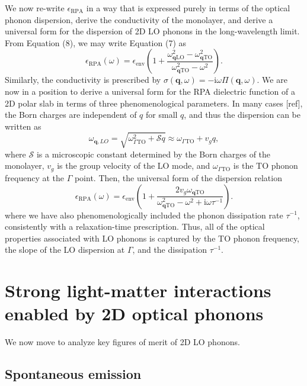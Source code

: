 \documentclass[aps,prb,twocolumn,
	groupedaddress,superscriptaddress,
	amsfonts,amssymb,amsmath,floatfix,
	citeautoscript]{revtex4-1}
\newcommand{\iu}{\mathrm{i}}
\begin{document}
We now re-write $\epsilon_{\mathrm{RPA}}$ in a way that is expressed purely in terms of the optical phonon dispersion, derive the conductivity of the monolayer, and derive a universal form for the dispersion of 2D LO phonons in the long-wavelength limit. From Equation (8), we may write Equation (7) as
\begin{equation}
\epsilon_{\mathrm{RPA}}(\omega) = \epsilon_{\mathrm{env}}\left( 1 + \frac{\omega^2_{\mathbf{q}\mathrm{LO}}-\omega^2_{\mathbf{q}\mathrm{TO}}}{\omega^2_{\mathbf{q}\mathrm{TO}}-\omega^2}\right).
\end{equation}
Similarly, the conductivity is prescribed by $\sigma(\mathbf{q},\omega) = -\iu \omega \Pi(\mathbf{q},\omega)$. We are now in a position to derive a universal form for the RPA dielectric function of a 2D polar slab in terms of three phenomenological parameters. In many cases [ref], the Born charges are independent of $q$ for small $q$, and thus the dispersion can be written as
\begin{equation}
\omega_{\mathbf{q},LO} = \sqrt{\omega^2_{\Gamma \mathrm{TO}}+\mathcal{S}q} \approx \omega_{\Gamma \mathrm{TO}} + v_g q,
\end{equation}
where $\mathcal{S}$ is a microscopic constant determined by the Born charges of the monolayer, $v_g$ is the group velocity of the LO mode, and $\omega_{\Gamma \mathrm{TO}}$ is the TO phonon frequency at the $\Gamma$ point. Then, the universal form of the dispersion relation 
\begin{equation}
\epsilon_{\mathrm{RPA}}(\omega) = \epsilon_{\mathrm{env}}\left( 1 + \frac{2v_g\omega_{\mathbf{q}\mathrm{TO}}}{\omega^2_{\mathbf{q}\mathrm{TO}}-\omega^2+\iu \omega \tau^{-1}}\right).
\end{equation}
where we have also phenomenologically included the phonon dissipation rate $\tau^{-1}$, consistently with  a relaxation-time prescription. Thus, all of the optical properties associated with LO phonons is captured by the TO phonon frequency, the slope of the LO dispersion at $\Gamma$, and the dissipation $\tau^{-1}$.


\section{Strong light-matter interactions enabled by 2D optical phonons}

We now move to analyze key figures of merit of 2D LO phonons.

\subsection{Spontaneous emission}
\end{document}
